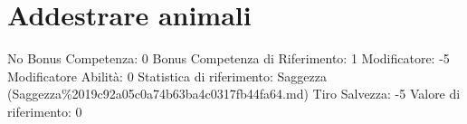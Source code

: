 \section{Addestrare animali}\label{addestrare-animali}

\begin{description}
\tightlist
\item[Tags: ABI]
No Bonus Competenza: 0 Bonus Competenza di Riferimento: 1 Modificatore:
-5 Modificatore Abilità: 0 Statistica di riferimento: Saggezza
(Saggezza\%2019c92a05c0a74b63ba4c0317fb44fa64.md) Tiro Salvezza: -5
Valore di riferimento: 0
\end{description}
